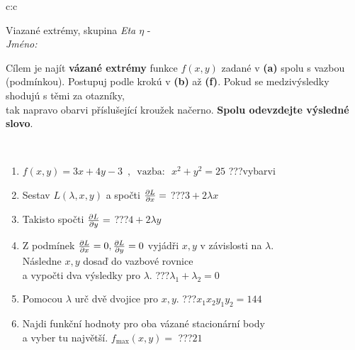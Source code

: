 \documentclass[10pt]{report}
\begin{document}
\begin{tabular}{c:c}
\begin{minipage}[c][104.5mm][t]{0.5\linewidth}
\begin{center}
\vspace{7mm}
{\huge Viazané extrémy, skupina \textit{Eta $\eta$} -}\\[5mm]
\textit{Jméno:}\phantom{xxxxxxxxxxxxxxxxxxxxxxxxxxxxxxxxxxxxxxxxxxxxxxxxxxxxxxxxxxxxxxxxx}\\[5mm]
\begin{minipage}{0.95\linewidth}
\begin{center}
Cílem je najít \textbf{vázané extrémy} funkce $f(x,y)$ zadané v \textbf{(a)} spolu s vazbou (podmínkou). Postupuj podle krokú v \textbf{(b)} až \textbf{(f)}. Pokud se medzivýsledky shodujú s těmi za otazníky,\\tak napravo obarvi příslušející kroužek načerno. \textbf{Spolu odevzdejte výsledné slovo}.
\end{center}
\end{minipage}
\\[1mm]
\begin{minipage}{0.79\linewidth}
\begin{center}
\begin{varwidth}{\linewidth}
\begin{enumerate}
\normalsize
\item $f(x,y)=3x+4y-3 \enspace , \enspace \mathrm{vazba:} \enspace x^2+y^2=25$\quad \dotfill\; ???\;\dotfill \quad vybarvi
\item Sestav $L(\lambda,x,y)$ a spočti $\pdv{L}{x}=$\quad \dotfill\; ???\;\dotfill \quad $3+2\lambda x$
\item Takisto spočti $\pdv{L}{y}=$\quad \dotfill\; ???\;\dotfill \quad $4+2\lambda y$
\item Z podmínek $\pdv{L}{x}=0 , \pdv{L}{y}=0$ vyjádři $x,y$ v závislosti na $\lambda$.\\ \phantom{xxxxxx}Následne $x,y$ dosaď do vazbové rovnice\\ \phantom{xxxxxx}a vypočti dva výsledky pro $\lambda$.\quad \dotfill\; ???\;\dotfill \quad $\lambda_1+\lambda_2=0$
\item Pomocou $\lambda$ urč dvě dvojice pro $x,y$.\quad \dotfill\; ???\;\dotfill \quad $x_1 x_2 y_1 y_2=144$
\item Najdi funkční hodnoty pro oba vázané stacionární body\\ \phantom{xxxxxx}a vyber tu najvětší. $f_{\text{max}}(x,y)=$\quad \dotfill\; ???\;\dotfill \quad $21$

\end{enumerate}
\end{varwidth}
\end{center}
\end{minipage}
\end{center}
\end{minipage}
\end{tabular}
\end{document}
